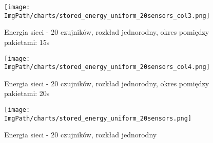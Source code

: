 \begin{figure}[H]
	\begin{center}
		\texttt{[image: \\ImgPath/charts/stored\_energy\_uniform\_20sensors\_col3.png]}
	\end{center}
	\caption{Energia sieci - 20 czujników, rozkład jednorodny, okres pomiędzy pakietami: 15s}
\end{figure}

\begin{figure}[H]
	\begin{center}
		\texttt{[image: \\ImgPath/charts/stored\_energy\_uniform\_20sensors\_col4.png]}
	\end{center}
	\caption{Energia sieci - 20 czujników, rozkład jednorodny, okres pomiędzy pakietami: 20s}
\end{figure}

\begin{figure}[H]
	\begin{center}
		\texttt{[image: \\ImgPath/charts/stored\_energy\_uniform\_20sensors.png]}
	\end{center}
	\caption{Energia sieci - 20 czujników, rozkład jednorodny}
\end{figure}